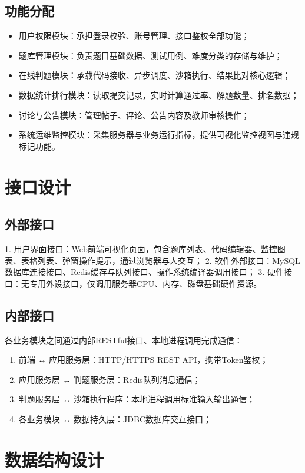\documentclass{../template/softeng}
\begin{document}
\subsection{功能分配}
\begin{itemize}
    \item 用户权限模块：承担登录校验、账号管理、接口鉴权全部功能；
    \item 题库管理模块：负责题目基础数据、测试用例、难度分类的存储与维护；
    \item 在线判题模块：承载代码接收、异步调度、沙箱执行、结果比对核心逻辑；
    \item 数据统计排行模块：读取提交记录，实时计算通过率、解题数量、排名数据；
    \item 讨论与公告模块：管理帖子、评论、公告内容及教师审核操作；
    \item 系统运维监控模块：采集服务器与业务运行指标，提供可视化监控视图与违规标记功能。
\end{itemize}

\section{接口设计}
\subsection{外部接口}
1. 用户界面接口：Web前端可视化页面，包含题库列表、代码编辑器、监控图表、表格列表、弹窗操作提示，通过浏览器与人交互；
2. 软件外部接口：MySQL数据库连接接口、Redis缓存与队列接口、操作系统编译器调用接口；
3. 硬件接口：无专用外设接口，仅调用服务器CPU、内存、磁盘基础硬件资源。

\subsection{内部接口}
各业务模块之间通过内部RESTful接口、本地进程调用完成通信：
\begin{enumerate}
    \item 前端 ↔ 应用服务层：HTTP/HTTPS REST API，携带Token鉴权；
    \item 应用服务层 ↔ 判题服务层：Redis队列消息通信；
    \item 判题服务层 ↔ 沙箱执行程序：本地进程调用标准输入输出通信；
    \item 各业务模块 ↔ 数据持久层：JDBC数据库交互接口；
\end{enumerate}

\section{数据结构设计}
\end{document}
